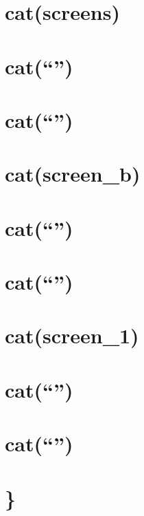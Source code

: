 \documentclass[]{article}
\begin{document}
\section{cat(screens)}\label{catscreens}

\section{\texorpdfstring{cat(``\n'')}{cat()}}\label{cat-46}

\section{\texorpdfstring{cat(``\n'')}{cat()}}\label{cat-47}

\section{cat(screen\_b)}\label{catscreen_b}

\section{\texorpdfstring{cat(``\n'')}{cat()}}\label{cat-48}

\section{\texorpdfstring{cat(``\n'')}{cat()}}\label{cat-49}

\section{cat(screen\_1)}\label{catscreen_1}

\section{\texorpdfstring{cat(``\n'')}{cat()}}\label{cat-50}

\section{\texorpdfstring{cat(``\n'')}{cat()}}\label{cat-51}

\section{\}}\label{section-13}

\section{}\label{section-14}
\end{document}
